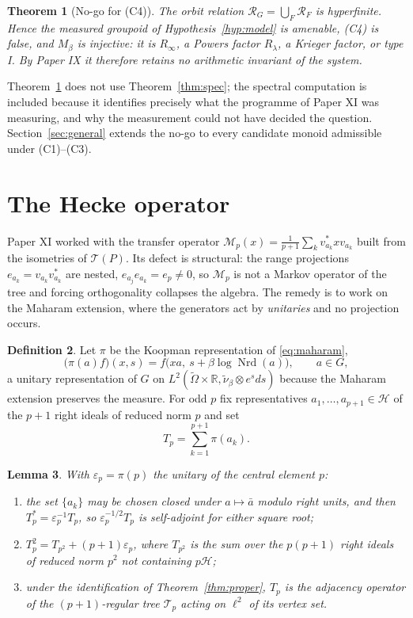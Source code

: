 \documentclass[11pt]{amsart}
\numberwithin{equation}{section}
\newtheorem{theorem}{Theorem}[section]
\newtheorem{lemma}[theorem]{Lemma}
\theoremstyle{definition}
\newtheorem{definition}[theorem]{Definition}
\theoremstyle{remark}
\newcommand{\R}{\mathbb{R}}
\newcommand{\cH}{\mathcal{H}}
\newcommand{\cM}{\mathcal{M}}
\newcommand{\cT}{\mathcal{T}}
\newcommand{\cR}{\mathcal{R}}
\newcommand{\Nrd}{\operatorname{Nrd}}
\begin{document}
\begin{theorem}[No-go for (C4)]\label{thm:nogo}
The orbit relation $\cR_G=\bigcup_F\cR_F$ is hyperfinite. Hence the measured groupoid of
Hypothesis~\ref{hyp:model} is amenable, (C4) is false, and $M_\beta$ is injective: it is
$R_\infty$, a Powers factor $R_\lambda$, a Krieger factor, or type I. By Paper IX it therefore
retains no arithmetic invariant of the system.
\end{theorem}

Theorem~\ref{thm:nogo} does not use Theorem~\ref{thm:spec}; the spectral computation is included
because it identifies precisely what the programme of Paper XI was measuring, and why the
measurement could not have decided the question. Section~\ref{sec:general} extends the no-go to
every candidate monoid admissible under (C1)--(C3).

\section{The Hecke operator}\label{sec:hecke}

Paper XI worked with the transfer operator $\cM_p(x)=\frac1{p+1}\sum_kv_{a_k}^*xv_{a_k}$ built
from the isometries of $\cT(P)$. Its defect is structural: the range projections
$e_{a_k}=v_{a_k}v_{a_k}^*$ are nested, $e_{a_j}e_{a_k}=e_p\ne0$, so $\cM_p$ is not a Markov
operator of the tree and forcing orthogonality collapses the algebra. The remedy is to work on the
Maharam extension, where the generators act by \emph{unitaries} and no projection occurs.

\begin{definition}\label{def:hecke}
Let $\pi$ be the Koopman representation of \eqref{eq:maharam},
\[
\bigl(\pi(a)f\bigr)(x,s)=f\bigl(xa,\ s+\beta\log\Nrd(a)\bigr),
\qquad a\in G,
\]
a unitary representation of $G$ on $L^2(\widetilde\Omega\times\R,\widetilde\nu_\beta\otimes e^sds)$
because the Maharam extension preserves the measure. For odd $p$ fix representatives
$a_1,\dots,a_{p+1}\in\cH$ of the $p+1$ right ideals of reduced norm $p$ and set
\[
T_p=\sum_{k=1}^{p+1}\pi(a_k).
\]
\end{definition}

\begin{lemma}\label{lem:hecke}
With $\varepsilon_p=\pi(p)$ the unitary of the central element $p$:
\begin{enumerate}
\item the set $\{a_k\}$ may be chosen closed under $a\mapsto\bar a$ modulo right units, and then
$T_p^*=\varepsilon_p^{-1}T_p$, so $\varepsilon_p^{-1/2}T_p$ is self-adjoint for either square root;
\item $T_p^2=T_{p^2}+(p+1)\varepsilon_p$, where $T_{p^2}$ is the sum over the $p(p+1)$ right
ideals of reduced norm $p^2$ not containing $p\cH$;
\item under the identification of Theorem~\ref{thm:proper}, $T_p$ is the adjacency operator of the
$(p+1)$-regular tree $\cT_p$ acting on $\ell^2$ of its vertex set.
\end{enumerate}
\end{lemma}
\end{document}
